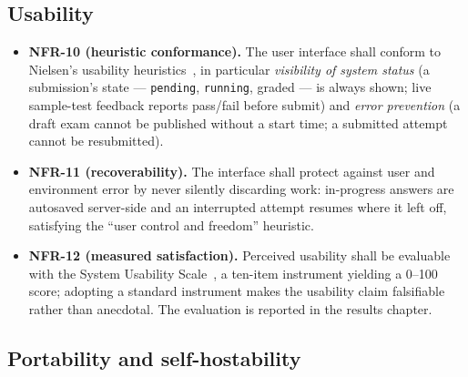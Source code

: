\subsection{Usability}
\label{sec:req-nfr-usability}

\begin{itemize}[leftmargin=1.4em]
  \item \textbf{NFR-10 (heuristic conformance).} The user interface shall conform to
        Nielsen's usability heuristics~\cite{nielsen-heuristics}, in particular
        \emph{visibility of system status} (a submission's state --- \texttt{pending},
        \texttt{running}, graded --- is always shown; live sample-test feedback reports
        pass/fail before submit) and \emph{error prevention} (a draft exam cannot be
        published without a start time; a submitted attempt cannot be resubmitted).
  \item \textbf{NFR-11 (recoverability).} The interface shall protect against user and
        environment error by never silently discarding work: in-progress answers are
        autosaved server-side and an interrupted attempt resumes where it left off,
        satisfying the ``user control and freedom'' heuristic.
  \item \textbf{NFR-12 (measured satisfaction).} Perceived usability shall be evaluable
        with the System Usability Scale~\cite{brooke1996sus}, a ten-item instrument
        yielding a 0--100 score; adopting a standard instrument makes the usability claim
        falsifiable rather than anecdotal. The evaluation is reported in the results
        chapter.
\end{itemize}

\subsection{Portability and self-hostability}
\label{sec:req-nfr-portability}

